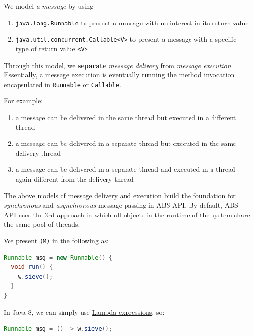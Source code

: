 We model \emph{a message} by using

\begin{enumerate}
\itemsep1pt\parskip0pt
\item
  \lstinline!java.lang.Runnable! to present a message with no interest
  in its return value\\
\item
  \lstinline!java.util.concurrent.Callable<V>! to present a message with
  a specific type of return value \lstinline!<V>!
\end{enumerate}

Through this model, we \textbf{separate} \emph{message delivery} from
\emph{message execution}. Essentially, a message execution is eventually
running the method invocation encapsulated in \lstinline!Runnable! or
\lstinline!Callable!.

For example:

\begin{enumerate}
\itemsep1pt\parskip0pt
\item
  a message can be delivered in the same thread but executed in a
  different thread\\
\item
  a message can be delivered in a separate thread but executed in the
  same delivery thread\\
\item
  a message can be delivered in a separate thread and executed in a
  thread again different from the delivery thread
\end{enumerate}

The above models of message delivery and execution build the foundation
for \emph{synchronous} and \emph{asynchronous} message passing in ABS
API. By default, ABS API uses the 3rd approach in which all objects in
the runtime of the system share the same pool of threads.

We present \lstinline!(M)! in the following as:

\begin{lstlisting}[language=Java]
Runnable msg = new Runnable() {
  void run() {
    w.sieve();
  }
}
\end{lstlisting}

In Java 8, we can simply use
\href{https://docs.oracle.com/javase/tutorial/java/javaOO/lambdaexpressions.html}{Lambda
expressions}, so:

\begin{lstlisting}[language=Java]
Runnable msg = () -> w.sieve();
\end{lstlisting}

